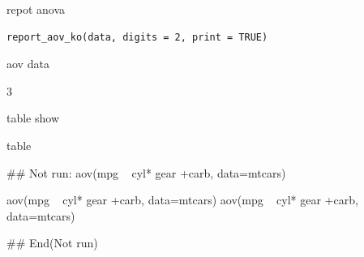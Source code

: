 \documentclass[a4paper]{book}
\begin{document}
%
\begin{Description}
repot anova
\end{Description}
%
\begin{Usage}
\begin{verbatim}
report_aov_ko(data, digits = 2, print = TRUE)
\end{verbatim}
\end{Usage}
%
\begin{Arguments}
\begin{ldescription}
\item[\code{data}] aov data

\item[\code{digits}] 3

\item[\code{print}] table show
\end{ldescription}
\end{Arguments}
%
\begin{Value}
table
\end{Value}
%
\begin{Examples}
\begin{ExampleCode}

\#\# Not run: 
aov(mpg ~ cyl* gear +carb, data=mtcars) %

aov(mpg ~ cyl* gear +carb, data=mtcars) %
aov(mpg ~ cyl* gear +carb, data=mtcars) %


## End(Not run)

\end{ExampleCode}
\end{Examples}
\end{document}
